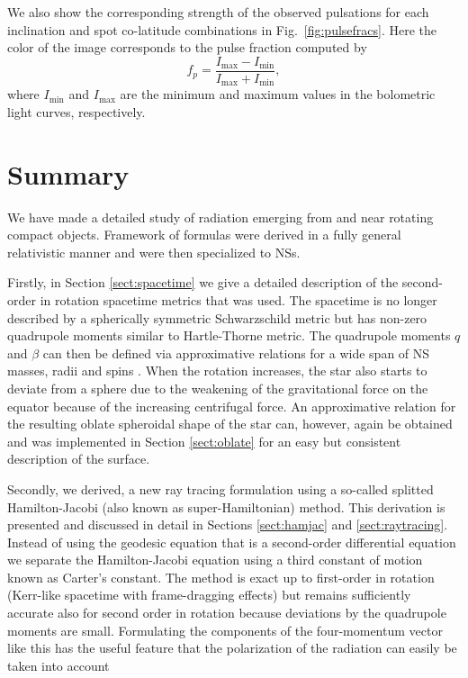 \documentclass[iop, usenatbib]{emulateapj}
\newcommand{\be}{\begin{equation}}
\newcommand{\ee}{\end{equation}}
\newcommand{\sch}{Schwarzschild }
\begin{document}
We also show the corresponding strength of the observed pulsations for each inclination and spot co-latitude combinations in Fig.~\ref{fig:pulsefracs}.
Here the color of the image corresponds to the pulse fraction computed by
\be
f_p = \frac{I_{\mathrm{max}} - I_{\mathrm{min}}}{I_{\mathrm{max}} + I_{\mathrm{min}}},
\ee
where $I_{\mathrm{min}}$ and $I_{\mathrm{max}}$ are the minimum and maximum values in the bolometric light curves, respectively.





\section{Summary}\label{sect:summary}
We have made a detailed study of radiation emerging from and near rotating compact objects.
Framework of formulas were derived in a fully general relativistic manner and were then specialized to NSs.

Firstly, in Section \ref{sect:spacetime} we give a detailed description of the second-order in rotation spacetime metrics that was used.
The spacetime is no longer described by a spherically symmetric \sch metric but has non-zero quadrupole moments similar to Hartle-Thorne metric.
The quadrupole moments $q$ and $\beta$ can then be defined via approximative relations for a wide span of NS masses, radii and spins \citep{aGM14}.
When the rotation increases, the star also starts to deviate from a sphere due to the weakening of the gravitational force on the equator because of the increasing centrifugal force.
An approximative relation for the resulting oblate spheroidal shape of the star can, however, again be obtained \citep{MLC07, aGM14} and was implemented in Section \ref{sect:oblate} for an easy but consistent description of the surface.

Secondly, we derived, a new ray tracing formulation using a so-called splitted Hamilton-Jacobi (also known as super-Hamiltonian) method.
This derivation is presented and discussed in detail in Sections \ref{sect:hamjac} and \ref{sect:raytracing}.
Instead of using the geodesic equation that is a second-order differential equation we separate the Hamilton-Jacobi equation using a third constant of motion known as Carter's constant.
The method is exact up to first-order in rotation (Kerr-like spacetime with frame-dragging effects) but remains sufficiently accurate also for second order in rotation because deviations by the quadrupole moments are small.
Formulating the components of the four-momentum vector like this has the useful feature that the polarization of the radiation can easily be taken into account \citep[see e.g.][]{cha, dexter2016}
\end{document}
